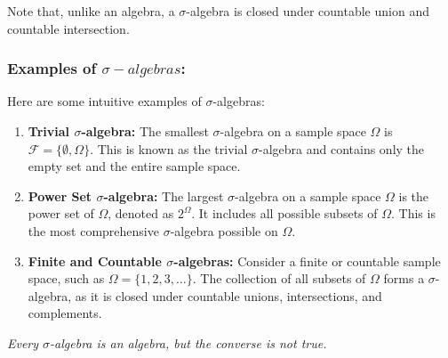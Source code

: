\noindent Note that, unlike an algebra, a $\sigma$-algebra is closed under countable union and countable intersection.

\subsubsection{Examples of $\sigma-algebras$:}

Here are some intuitive examples of $\sigma$-algebras:

\begin{enumerate}
    \item \textbf{Trivial $\sigma$-algebra:} The smallest $\sigma$-algebra on a sample space $\Omega$ is $\mathcal{F} = \{\emptyset, \Omega\}$. This is known as the trivial $\sigma$-algebra and contains only the empty set and the entire sample space.

    \item \textbf{Power Set $\sigma$-algebra:} The largest $\sigma$-algebra on a sample space $\Omega$ is the power set of $\Omega$, denoted as $2^{\Omega}$. It includes all possible subsets of $\Omega$. This is the most comprehensive $\sigma$-algebra possible on $\Omega$.

    \item \textbf{Finite and Countable $\sigma$-algebras:} Consider a finite or countable sample space, such as $\Omega = \{1, 2, 3, \ldots\}$. The collection of all subsets of $\Omega$ forms a $\sigma$-algebra, as it is closed under countable unions, intersections, and complements.\\
\end{enumerate}


\begin{theorem}
    \textit{Every $\sigma$-algebra is an algebra, but the converse is not true.} 
\end{theorem} 

